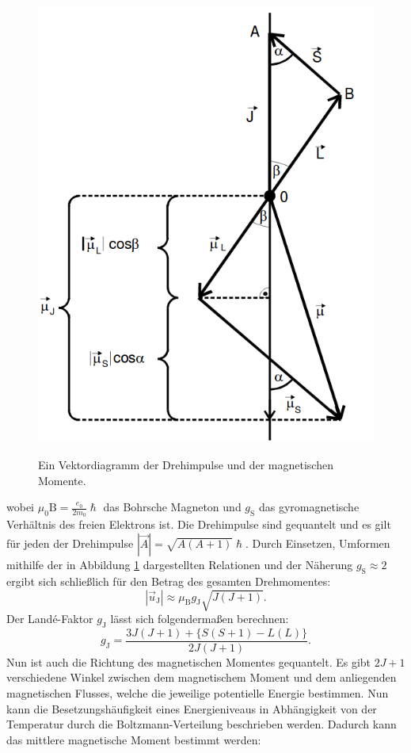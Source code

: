 \begin{figure}
	\centering
	\caption{Ein Vektordiagramm der Drehimpulse und der magnetischen Momente.}
	\includegraphics[width=\linewidth-70pt,height=\textwidth-200pt,keepaspectratio]{content/images/Vektordiagramm.png}
	\label{fig:Vektordiagramm}
\end{figure}
wobei $\mu_0\text{B}=\frac{e_0}{2 m_0} \hslash$ das Bohrsche Magneton und $g_\text{S}$ das gyromagnetische Verhältnis des freien Elektrons ist. Die Drehimpulse sind gequantelt und es gilt für jeden der Drehimpulse $|\vec{A}|= \sqrt{A(A+1)} \hslash$. Durch Einsetzen, Umformen mithilfe der in Abbildung \ref{fig:Vektordiagramm} dargestellten Relationen und der Näherung $g_\text{S}\approx 2$ ergibt sich schließlich für den Betrag des gesamten Drehmomentes:
\begin{equation}
	|\vec{u}_\text{J}|\approx \mu_\text{B} g_\text{J} \sqrt{J(J+1)} \text{.}
\end{equation}
Der Landé-Faktor $g_\text{J}$ lässt sich folgendermaßen berechnen:
\begin{equation}
	g_\text{J}=\frac{3 J(J+1) + \{S(S+1) - L(L)\}}{2 J(J+1)}\text{.}\label{eq:g_J}
\end{equation}
Nun ist auch die Richtung des magnetischen Momentes gequantelt. Es gibt $2 J +1$ verschiedene Winkel zwischen dem magnetischem Moment und dem anliegenden magnetischen Flusses, welche die jeweilige potentielle Energie bestimmen. Nun kann die Besetzungshäufigkeit eines Energieniveaus in Abhängigkeit von der Temperatur durch die Boltzmann-Verteilung beschrieben werden. Dadurch kann das mittlere magnetische Moment bestimmt werden:
